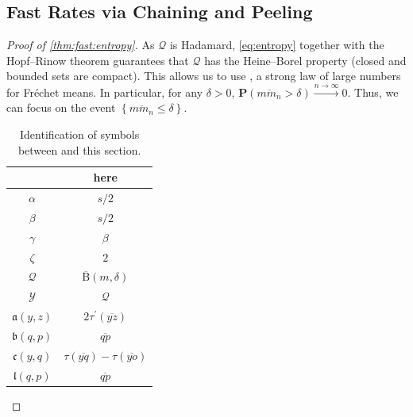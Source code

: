 \documentclass{article}
\newcommand*{\mc}[1]{\mathcal{#1}}
\newcommand*{\mf}[1]{\mathfrak{#1}}
\newcommand{\ball}{\mathrm{B}}
\newcommand{\lcb}{\left\lbrace} %
\newcommand{\rcb}{\right\rbrace} %
\newcommand{\cb}[1]{\lcb #1 \rcb} %
\newcommand{\lb}{\left(} %
\newcommand{\rb}{\right)} %
\newcommand{\br}[1]{\lb #1 \rb} %
\newcommand{\brOf}[1]{\!\br{#1}} %
\renewcommand{\Pr}{\mathbf{P}} %
\newcommand{\PrOf}[1]{\Pr\brOf{#1}}
\newcommand{\pr}{^\prime}
\newcommand{\ol}[2]{\overline{#1#2}}
\newcommand{\tran}{\tau}
\newcommand{\dtran}{\tau\pr}
\newcommand{\ballclosed}{\overline{\ball}}
\begin{document}
\subsection{Fast Rates via Chaining and Peeling}
%
\begin{proof}[Proof of \cref{thm:fast:entropy}]
    As $\mc Q$ is Hadamard, \eqref{eq:entropy} together with the Hopf--Rinow theorem guarantees that $\mc Q$ has the Heine--Borel property (closed and bounded sets are compact). This allows us to use \cite[Corollary 2]{Park2026}, a strong law of large numbers for Fr\'echet means. In particular, for any $\delta>0$, $\PrOf{\ol m{m_n} > \delta} \xrightarrow{n\to\infty} 0$. Thus, we can focus on the event $\cb{\ol m{m_n} \leq \delta}$.
    
    \begin{table}
    \begin{tabular}{c|c}
        \cite{schoetz19} & here \\
        \hline
        $\alpha$ & $s/2$\\
        $\beta$ & $s/2$\\
        $\gamma$ & $\beta$\\
        $\zeta$ & $2$\\
        $\mc Q$ & $\ballclosed(m, \delta)$\\
        $\mc Y$ & $\mc Q$\\
        $\mf a(y,z)$ & $2 \dtran(\ol yz)$\\
        $\mf b(q,p)$ & $\ol qp$\\
        $\mf c(y,q)$ & $\tran(\ol yq) - \tran(\ol yo)$\\
        $\mf l(q,p)$ & $\ol qp$
    \end{tabular}
    \caption{Identification of symbols between \cite[Theorem 1]{schoetz19} and this section.}\label{tbl:ident}
    \end{table}
    

\end{proof}
\end{document}
